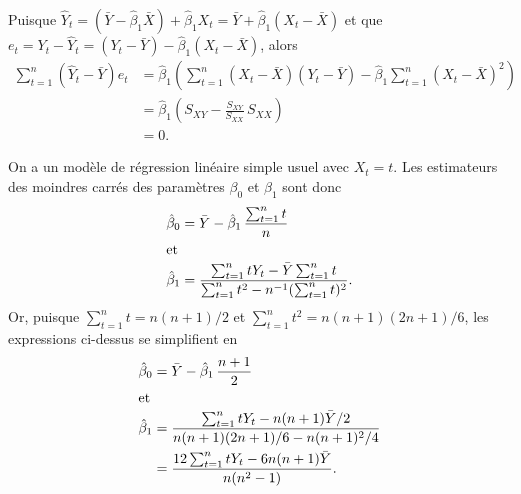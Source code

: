 \begin{solution}{2.4}
    Puisque $\hat{Y}_t = (\bar{Y} - \hat{\beta}_1 \bar{X}) +
    \hat{\beta}_1 X_t = \bar{Y} + \hat{\beta}_1 (X_t - \bar{X})$ et
    que $e_t = Y_t - \hat{Y}_t = (Y_t - \bar{Y}) - \hat{\beta}_1 (X_t
    - \bar{X})$, alors
    \begin{align*}
      \sum_{t = 1}^n (\hat{Y}_t - \bar{Y}) e_t
      &= \hat{\beta}_1
      \left(
        \sum_{t=1}^n (X_t - \bar{X})(Y_t - \bar{Y}) -
        \hat{\beta}_1 \sum_{t = 1}^n (X_t - \bar{X})^2
      \right) \\
      & = \hat{\beta}_1
      \left(
        S_{XY} - \frac{S_{XY}}{S_{XX}}\, S_{XX}
      \right) \\
      & = 0.
    \end{align*}
  
\end{solution}
\begin{solution}{2.5}
    On a un modèle de régression linéaire simple usuel avec $X_t =
    t$. Les estimateurs des moindres carrés des paramètres $\beta_0$ et
    $\beta_1$ sont donc
    \begin{align*}
      \hat{\beta}_0
      &= \bar{Y} - \hat{\beta}_1\, \frac{\sum_{t = 1}^n t}{n} \\
      \intertext{et}
      \hat{\beta}_1
      &= \frac{\sum_{t = 1}^n t Y_t - \bar{Y} \sum_{t = 1}^n t}{\sum_{t
          = 1}^n t^2 - n^{-1} (\sum_{t = 1}^n t)^2}.
    \end{align*}
    Or, puisque $\sum_{t = 1}^n t = n(n + 1)/2$ et $\sum_{t = 1}^n t^2
    = n(n + 1)(2n + 1)/6$, les expressions ci-dessus se simplifient en
    \begin{align*}
      \hat{\beta}_0
      & = \bar{Y} - \hat{\beta}_1\, \frac{n + 1}{2} \\
      \intertext{et}
      \hat{\beta}_1
      & = \frac{\sum_{t=1}^n t Y_t - n(n + 1) \bar{Y}/2}{n(n + 1)(2n +
        1)/6 - n(n + 1)^2/4} \\
      & = \frac{12 \sum_{t=1}^n t Y_t - 6 n (n + 1) \bar{Y}}{n (n^2 - 1)}.
    \end{align*}
  
\end{solution}
